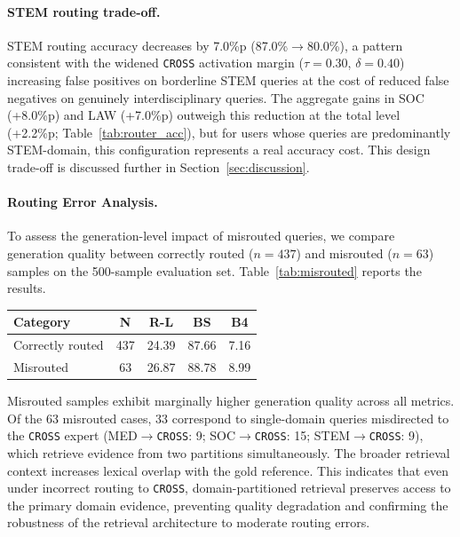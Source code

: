 \documentclass[a4paper,fleql]{cas-sc}
\begin{document}
\paragraph{STEM routing trade-off.}
STEM routing accuracy decreases by 7.0\%p (87.0\%$\to$80.0\%), a pattern
consistent with the widened \texttt{CROSS} activation margin ($\tau{=}0.30$,
$\delta{=}0.40$) increasing false positives on borderline STEM queries at
the cost of reduced false negatives on genuinely interdisciplinary queries.
The aggregate gains in SOC (+8.0\%p) and LAW (+7.0\%p) outweigh this
reduction at the total level (+2.2\%p; Table~\ref{tab:router_acc}), but for
users whose queries are predominantly STEM-domain, this configuration
represents a real accuracy cost. This design trade-off is discussed further in
Section~\ref{sec:discussion}.

\paragraph{Routing Error Analysis.}
To assess the generation-level impact of misrouted queries, we compare
generation quality between correctly routed ($n{=}437$) and misrouted
($n{=}63$) samples on the 500-sample evaluation set.
Table~\ref{tab:misrouted} reports the results.

\vspace{6pt plus 4pt minus 3pt}
\begin{center}
\begingroup
{}
\label{tab:misrouted}
\begin{tabular}{lcccc}
\toprule
\textbf{Category} & \textbf{N} & \textbf{R-L} & \textbf{BS} & \textbf{B4} \\
\midrule
Correctly routed & 437 & 24.39 & 87.66 & 7.16 \\
Misrouted        &  63 & 26.87 & 88.78 & 8.99 \\
\bottomrule
\end{tabular}
\endgroup
\end{center}
\vspace{6pt plus 4pt minus 3pt}

Misrouted samples exhibit marginally higher generation quality across all
metrics. Of the 63 misrouted cases, 33 correspond to single-domain queries
misdirected to the \texttt{CROSS} expert (MED$\to$\texttt{CROSS}: 9;
SOC$\to$\texttt{CROSS}: 15; STEM$\to$\texttt{CROSS}: 9), which retrieve
evidence from two partitions
simultaneously. The broader retrieval context increases lexical overlap with
the gold reference. This indicates that even under incorrect routing to
\texttt{CROSS}, domain-partitioned retrieval preserves access to the primary
domain evidence, preventing quality degradation and confirming the robustness
of the retrieval architecture to moderate routing errors.
\end{document}
